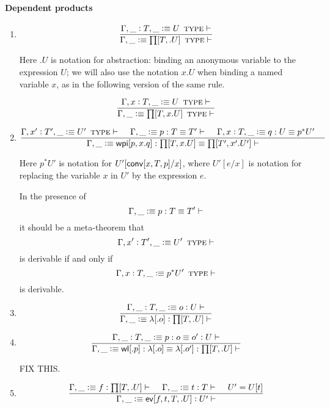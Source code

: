 \documentclass[11pt]{article}
\newcommand{\eqd}{\equiv}
\newcommand{\spc}{{\,\,\,\,\,\,\,}}
\newcommand{\ccolon}{\vcentcolon}
\newcommand{\ccheck}{\vcentcolon}            %
\newcommand{\csynth}{\vcentcolon\vcentcolon} %
\renewcommand{\csynth}{\ccheck}              %
\newcommand{\Type}{\mathop{\text{ \sc type}}}
\newcommand{\Okay}{\mathop{\text{ \sc okay}}}
\newcommand{\Context}{\vdash\Okay}
\renewcommand{\Context}{\vdash}
\newcommand{\ha}[2]{#1[#2]}
\newcommand{\annot}{{\sf annot}}
\newcommand{\haa}[2]{\ha\annot{#1,#2}}
\renewcommand{\haa}[2]{#1}
\newcommand{\conv}{{\sf conv}}
\newcommand{\ev}{{\sf ev}}
\newcommand{\wl}{{\sf wl}}
\newcommand{\wpi}{{\sf wpi}}
\newcommand{\var}{\char`_}
\newcommand{\defn}{\vcentcolon\equiv}
\begin{document}
\paragraph{Dependent products}

\begin{enumerate}

\item 
\[\frac{ \Gamma, \var \ccolon T, \var \defn U\Type \Context }{\Gamma, \var \defn \ha\prod{T,.U}\Type\Context}\]

Here $.U$ is notation for abstraction: binding an anonymous variable to the
expression $U$; we will also use the notation $x.U$ when binding a named
variable $x$, as in the following version of the same rule.

\[\frac{ \Gamma, x \ccolon T, \var \defn U\Type \Context }{\Gamma, \var \defn
  \ha\prod{T,x.U}\Type \Context}\]

\item 
\[ \frac{ 
  \Gamma, x' \ccolon T', \var \defn U'  \Type \Context \spc 
  \Gamma, \var \defn p:T \eqd T' \Context \spc
  \Gamma,  x \ccolon T, \var \defn q:U \eqd p^*U' \spc
  } {
  \Gamma, \var \defn \ha\wpi{p,x.q}:\ha\prod{T,x.U}\eqd \ha\prod{T',x'.U'} \Context
}\]

Here ${p}^*U'$ is notation for $U'[\haa {\ha\conv{x,T,p}} {T'}/x]$, where
$U'[e/x]$ is notation for replacing the variable $x$ in $U'$ by the expression
$e$.

In the presence of $$\Gamma, \var \defn p:T \eqd T' \Context $$ it should be a
meta-theorem that $$\Gamma, x' \ccolon T', \var \defn U' \Type \Context$$ is
derivable if and only if $$\Gamma, x \ccolon T, \var \defn p^* U' \Type
\Context$$ is derivable.

\item 
\[\frac{
  \Gamma, \var \ccolon T, \var\defn o \ccheck{U} \Context
}{\Gamma, \var\defn \ha\lambda{.o} \ccheck{\ha\prod{T,.U}} \Context}
\]


\item 
\[\frac{
  \Gamma, \var \ccolon T, \var\defn p : o\eqd o' \ccheck{U} \Context
}{
  \Gamma, \var\defn \ha\wl{.p} : \ha\lambda{.o}\eqd \ha\lambda{.o'} : \ha\prod{T,.U} \Context
}\]

FIX THIS.

\item 
\[\frac{
  \Gamma, \var\defn f \ccheck{\ha\prod{T,.U}} \Context
  \spc 
  \Gamma, \var\defn t \ccheck{T}\Context
  \spc
  U' = U[\haa t T]
}{
  \Gamma, \var\defn \ha \ev{f,t,T,.U} \csynth{U'} \Context
}\]


\end{enumerate}
\end{document}
